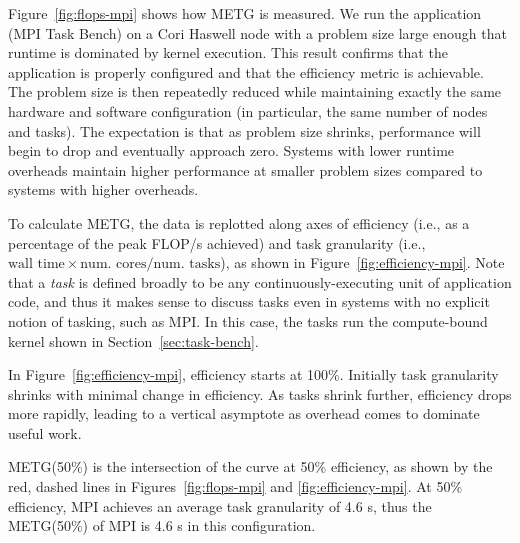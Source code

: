 


Figure~\ref{fig:flops-mpi} shows how METG is
measured. We run the application (MPI Task Bench) on a Cori Haswell node
with a problem size large enough that runtime is dominated by kernel
execution. This result confirms
that the application is properly configured and that the
efficiency metric is achievable. The problem
size is then repeatedly reduced while maintaining exactly the same hardware and software
configuration (in particular, the same number of nodes and tasks). The
expectation is that as problem size shrinks,
performance will begin to drop and eventually approach zero. Systems
with lower runtime overheads maintain higher performance at smaller
problem sizes compared to systems with higher overheads.

To calculate METG, the data is replotted along axes of efficiency
(i.e., as a percentage of the peak FLOP/s achieved) and task
granularity (i.e., $\text{wall time} \times \text{num.~cores}/\text{num.~tasks}$), as shown in Figure~\ref{fig:efficiency-mpi}. Note that a \emph{task} is defined
broadly to be any continuously-executing unit of application code,
and thus it makes sense to discuss tasks even in systems
with no explicit notion of tasking, such as MPI. In this case, the
tasks run the compute-bound kernel shown in
Section~\ref{sec:task-bench}.

In Figure~\ref{fig:efficiency-mpi},
efficiency starts at 100\%. Initially task granularity
shrinks with minimal change in efficiency. As tasks shrink further, efficiency drops more rapidly, leading
to a vertical asymptote as overhead comes to dominate useful work.


METG(50\%) is the intersection of the curve at 50\% efficiency, as
shown by the red, dashed lines in Figures~\ref{fig:flops-mpi} and
\ref{fig:efficiency-mpi}. At 50\% efficiency, MPI achieves an average
task granularity of
4.6 \textmu{}s, thus the METG(50\%) of MPI is 4.6 \textmu{}s in this
configuration. %

